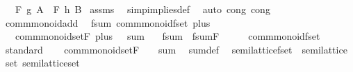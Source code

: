 \begin{isabellebody}
\ \ \ {\isachardoublequoteopen}F\ g\ A\ {\isacharequal}\ F\ h\ B{\isachardoublequoteclose}\isanewline
%
\isadelimproof
%
\endisadelimproof
%
\isatagproof
{}\isamarkupfalse%
\ assms\ \isamarkupfalse%
\ simp{\isacharunderscore}implies{\isacharunderscore}def\ \isamarkupfalse%
\ {\isacharparenleft}auto\ cong{\isacharcolon}\ cong{\isacharparenright}%
\endisatagproof
{\isafoldproof}%
%
\isadelimproof
\isanewline
%
\endisadelimproof
\isanewline
{}\isamarkupfalse%
\isanewline
\isanewline
{}\isamarkupfalse%
\ comm{\isacharunderscore}monoid{\isacharunderscore}add\ \isanewline
\isanewline
{}\isamarkupfalse%
\ fsum{\isacharcolon}\ comm{\isacharunderscore}monoid{\isacharunderscore}fset\ plus\ {}\isanewline
\ \ \ {\isachardoublequoteopen}comm{\isacharunderscore}monoid{\isacharunderscore}set{\isachardot}F\ plus\ {}\ {\isacharequal}\ sum{\isachardoublequoteclose}\isanewline
\ \ \ fsum\ {\isacharequal}\ fsum{\isachardot}F\isanewline
%
\isadelimproof
%
\endisadelimproof
%
\isatagproof
{}\isamarkupfalse%
\ {\isacharminus}\isanewline
\ \ \isamarkupfalse%
\ {\isachardoublequoteopen}comm{\isacharunderscore}monoid{\isacharunderscore}fset\ {\isacharparenleft}{\isacharplus}{\isacharparenright}\ {}{\isachardoublequoteclose}\ \isamarkupfalse%
\ standard\isanewline
\isanewline
\ \ \isamarkupfalse%
\ {\isachardoublequoteopen}comm{\isacharunderscore}monoid{\isacharunderscore}set{\isachardot}F\ {\isacharparenleft}{\isacharplus}{\isacharparenright}\ {}\ {\isacharequal}\ sum{\isachardoublequoteclose}\ \isamarkupfalse%
\ sum{\isacharunderscore}def\ \isacommand{{\isachardot}{\isachardot}}\isamarkupfalse%
\isanewline
{}\isamarkupfalse%
%
\endisatagproof
{\isafoldproof}%
%
\isadelimproof
\isanewline
%
\endisadelimproof
\isanewline
{}\isamarkupfalse%
%
\isadelimdocument
%
\endisadelimdocument
%
\isatagdocument
%
\isamarkuptrue%
%
\endisatagdocument
{\isafolddocument}%
%
\isadelimdocument
%
\endisadelimdocument
{}\isamarkupfalse%
\ semilattice{\isacharunderscore}fset\ {\isacharequal}\ semilattice\isanewline
{}\isanewline
\isanewline
{}\isamarkupfalse%
\ set{\isacharcolon}\ semilattice{\isacharunderscore}set%
\isadelimproof
\ %
\endisadelimproof
%
\isatagproof

\end{isabellebody}
